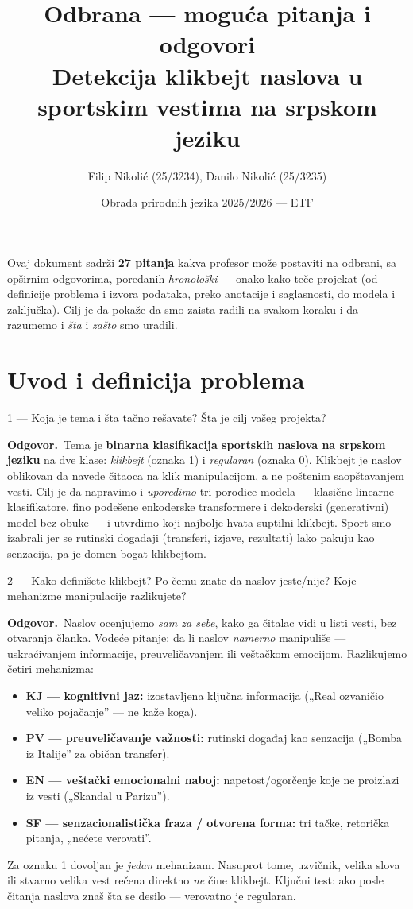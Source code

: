 \documentclass[11pt,a4paper]{article}
\title{\textbf{Odbrana --- moguća pitanja i odgovori}\\[2pt]
\large Detekcija klikbejt naslova u sportskim vestima na srpskom jeziku}
\author{Filip Nikolić (25/3234), Danilo Nikolić (25/3235)}
\date{Obrada prirodnih jezika 2025/2026 --- ETF}
\newcommand{\odg}{\smallskip\noindent\textbf{Odgovor.}\ }
\begin{document}
\maketitle

\noindent
Ovaj dokument sadrži \textbf{27 pitanja} kakva profesor može postaviti na odbrani, sa
opširnim odgovorima, poređanih \emph{hronološki} --- onako kako teče projekat (od
definicije problema i izvora podataka, preko anotacije i saglasnosti, do modela i
zaključka). Cilj je da pokaže da smo zaista radili na svakom koraku i da razumemo
i \emph{šta} i \emph{zašto} smo uradili.

\section{Uvod i definicija problema}

\begin{pitanje}{1 --- Koja je tema i šta tačno rešavate?}
Šta je cilj vašeg projekta?
\end{pitanje}
\odg Tema je \textbf{binarna klasifikacija sportskih naslova na srpskom jeziku} na dve
klase: \emph{klikbejt} (oznaka 1) i \emph{regularan} (oznaka 0). Klikbejt je naslov
oblikovan da navede čitaoca na klik manipulacijom, a ne poštenim saopštavanjem vesti.
Cilj je da napravimo i \emph{uporedimo} tri porodice modela --- klasične linearne
klasifikatore, fino podešene enkoderske transformere i dekoderski (generativni) model
bez obuke --- i utvrdimo koji najbolje hvata suptilni klikbejt. Sport smo izabrali jer
se rutinski događaji (transferi, izjave, rezultati) lako pakuju kao senzacija, pa je
domen bogat klikbejtom.

\begin{pitanje}{2 --- Kako definišete klikbejt? Po čemu znate da naslov jeste/nije?}
Koje mehanizme manipulacije razlikujete?
\end{pitanje}
\odg Naslov ocenjujemo \emph{sam za sebe}, kako ga čitalac vidi u listi vesti, bez
otvaranja članka. Vodeće pitanje: da li naslov \emph{namerno} manipuliše --- uskraćivanjem
informacije, preuveličavanjem ili veštačkom emocijom. Razlikujemo četiri mehanizma:
\begin{itemize}[nosep]
  \item \textbf{KJ --- kognitivni jaz:} izostavljena ključna informacija
    („Real ozvaničio veliko pojačanje'' --- ne kaže koga).
  \item \textbf{PV --- preuveličavanje važnosti:} rutinski događaj kao senzacija
    („Bomba iz Italije'' za običan transfer).
  \item \textbf{EN --- veštački emocionalni naboj:} napetost/ogorčenje koje ne
    proizlazi iz vesti („Skandal u Parizu'').
  \item \textbf{SF --- senzacionalistička fraza / otvorena forma:} tri tačke,
    retorička pitanja, „nećete verovati''.
\end{itemize}
Za oznaku 1 dovoljan je \emph{jedan} mehanizam. Nasuprot tome, uzvičnik, velika slova
ili stvarno velika vest rečena direktno \emph{ne} čine klikbejt. Ključni test: ako
posle čitanja naslova znaš šta se desilo --- verovatno je regularan.
\end{document}
